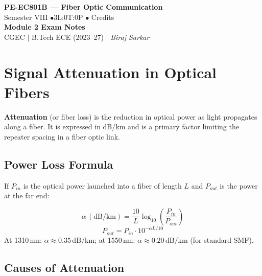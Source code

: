 \documentclass[12pt,a4paper]{article}
\begin{document}
\begin{center}
  {\LARGE\bfseries\color{myred} PE-EC801B --- Fiber Optic Communication}\\[5pt]
  {\normalsize\color{mydark} Semester VIII \quad$\bullet$\quad 3L:0T:0P \quad$\bullet$ Credits}\\[3pt]
  {\normalsize\color{myteal}\textbf{Module 2 Exam Notes}}\\[3pt]
  {\small\color{mydark} CGEC \;$|$\; B.Tech ECE (2023--27) \;$|$\; \textit{Biraj Sarkar}}
\end{center}
\vspace{2pt}
\noindent{\color{myred}\rule{\linewidth}{1.5pt}}
\vspace{2pt}

\hypersetup{linkcolor=mydark}
\tableofcontents
\hypersetup{linkcolor=myteal}
\newpage

\section{Signal Attenuation in Optical Fibers}

\begin{tcolorbox}[defbox, title={\textbf{Definition of Attenuation}}]
\textbf{Attenuation} (or fiber loss) is the reduction in optical power as light propagates along a fiber. It is expressed in dB/km and is a primary factor limiting the repeater spacing in a fiber optic link.
\end{tcolorbox}

\subsection{Power Loss Formula}
If $P_{in}$ is the optical power launched into a fiber of length $L$ and $P_{out}$ is the power at the far end:
\begin{tcolorbox}[formulabox, title={\textbf{Attenuation Coefficient}}]
\[
\alpha\,(\text{dB/km}) = \frac{10}{L}\log_{10}\!\left(\frac{P_{in}}{P_{out}}\right)
\]
\[
P_{out} = P_{in} \cdot 10^{-\alpha L/10}
\]
At 1310\,nm: $\alpha \approx 0.35\,\text{dB/km}$; at 1550\,nm: $\alpha \approx 0.20\,\text{dB/km}$ (for standard SMF).
\end{tcolorbox}

\subsection{Causes of Attenuation}
\end{document}
